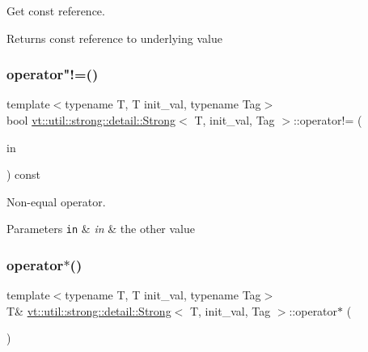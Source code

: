 Get const reference. 

\begin{DoxyReturn}{Returns}
const reference to underlying value 
\end{DoxyReturn}
\mbox{\label{structvt_1_1util_1_1strong_1_1detail_1_1_strong_aa6dd594219a084feae812a5975240963}} 
\subsubsection{\texorpdfstring{operator"!=()}{operator!=()}}
{\footnotesize\ttfamily template$<$typename T, T init\+\_\+val, typename Tag$>$ \\
bool \hyperlink{structvt_1_1util_1_1strong_1_1detail_1_1_strong}{vt\+::util\+::strong\+::detail\+::\+Strong}$<$ T, init\+\_\+val, Tag $>$\+::operator!= (\begin{DoxyParamCaption}\item[{\hyperlink{structvt_1_1util_1_1strong_1_1detail_1_1_strong_a510d40741bda362d97a4753919a577dd}{This\+Type} const \&}]{in }\end{DoxyParamCaption}) const\hspace{0.3cm}{\ttfamily [inline]}}



Non-\/equal operator. 


\begin{DoxyParams}[1]{Parameters}
\mbox{\tt in}  & {\em in} & the other value \\
\hline
\end{DoxyParams}
\mbox{\label{structvt_1_1util_1_1strong_1_1detail_1_1_strong_ab0423a5f73f3d080e84bab4db2bd10f8}} 
\subsubsection{\texorpdfstring{operator$\ast$()}{operator*()}\hspace{0.1cm}{\footnotesize\ttfamily [1/2]}}
{\footnotesize\ttfamily template$<$typename T, T init\+\_\+val, typename Tag$>$ \\
T\& \hyperlink{structvt_1_1util_1_1strong_1_1detail_1_1_strong}{vt\+::util\+::strong\+::detail\+::\+Strong}$<$ T, init\+\_\+val, Tag $>$\+::operator$\ast$ (\begin{DoxyParamCaption}{ }\end{DoxyParamCaption})\hspace{0.3cm}{\ttfamily [inline]}}



